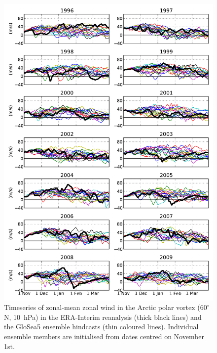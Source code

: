  \begin{figure}[p]
 \vspace*{-3cm}
 \centering
 \noindent\includegraphics[width=40pc]{figures/GloSea5/zm_winds_nh_poststamp.pdf}
 \caption[Timeseries of $\overline{U}$ at 60$^{\circ}$N, 10~hPa, for all GloSea5 ensemble members.]{Timeseries of zonal-mean zonal wind in the Arctic polar vortex ($60^{\circ}$N, 10~hPa) in the ERA-Interim reanalysis (thick black lines) and the GloSea5 ensemble hindcasts (thin coloured lines). Individual ensemble members are initialised from dates centred on November 1st. }
 \label{fig:nh_poststamp}
 \end{figure}

